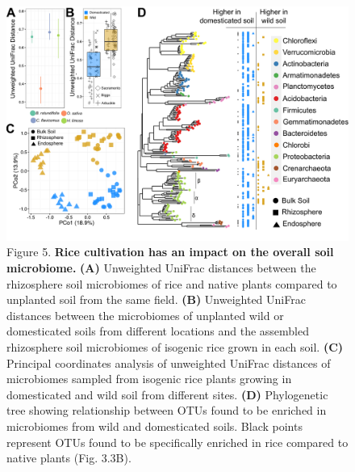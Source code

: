 \begin{figure}[h]
\centering
\includegraphics[width=6in]{Figures/figure2_5}
\caption[Figure 3.5]{Figure 5. \textbf{Rice cultivation has an impact on the overall soil microbiome.} \textbf{(A)} Unweighted UniFrac distances between the rhizosphere soil microbiomes of rice and native plants compared to unplanted soil from the same field. \textbf{(B)} Unweighted UniFrac distances between the microbiomes of unplanted wild or domesticated soils from different locations and the assembled rhizosphere soil microbiomes of isogenic rice grown in each soil. \textbf{(C)} Principal coordinates analysis of unweighted UniFrac distances of microbiomes sampled from isogenic rice plants growing in domesticated and wild soil from different sites. \textbf{(D)} Phylogenetic tree showing relationship between OTUs found to be enriched in microbiomes from wild and domesticated soils. Black points represent OTUs found to be specifically enriched in rice compared to native plants (Fig. 3.3B).}
\label{Figure 3.5}
\end{figure}

